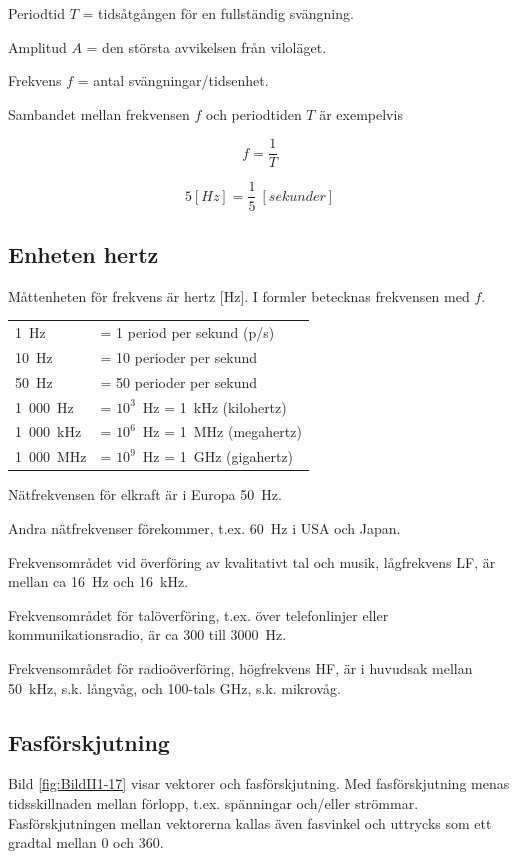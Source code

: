 Periodtid \(T\) = tidsåtgången för en fullständig svängning.

Amplitud \(A\) = den största avvikelsen från viloläget.

Frekvens \(f\) = antal svängningar/tidsenhet.

Sambandet mellan frekvensen \(f\) och periodtiden \(T\) är exempelvis

\[f=\dfrac{1}{T}\] 

\[5 [\unit{Hz}] = \dfrac{1}{5}\ [\unit{sekunder}]\]

\subsection{Enheten hertz}

Måttenheten för frekvens är hertz [Hz].
I formler betecknas frekvensen med \(f\).

\begin{center}
\begin{tabular}{ll}
1~Hz      & = 1 period per sekund (p/s) \\
10~Hz     & = 10 perioder per sekund \\
50~Hz     & = 50 perioder per sekund \\
1~000~Hz  & = \(10^3\)~Hz = 1~kHz (kilohertz) \\
1~000~kHz & = \(10^6\)~Hz = 1~MHz (megahertz) \\
1~000~MHz & = \(10^9\)~Hz = 1~GHz (gigahertz) \\
\end{tabular}
\end{center}

Nätfrekvensen för elkraft är i Europa 50~Hz.

Andra nätfrekvenser förekommer, t.ex. 60~Hz i USA och Japan.

Frekvensområdet vid överföring av kvalitativt tal och musik, lågfrekvens LF, är
mellan ca 16~Hz och 16~kHz.

Frekvensområdet för talöverföring, t.ex. över telefonlinjer eller
kommunikationsradio, är ca 300 till 3000~Hz.

Frekvensområdet för radioöverföring, högfrekvens HF, är i huvudsak mellan
50~kHz, s.k. långvåg, och 100-tals GHz, s.k. mikrovåg.

\subsection{Fasförskjutning}
Bild \ref{fig:BildII1-17} visar vektorer och fasförskjutning.
Med fasförskjutning menas tidsskillnaden mellan förlopp, t.ex. spänningar
och/eller strömmar.
Fasförskjutningen mellan vektorerna kallas även fasvinkel och uttrycks som ett
gradtal mellan 0 och 360\degree.

